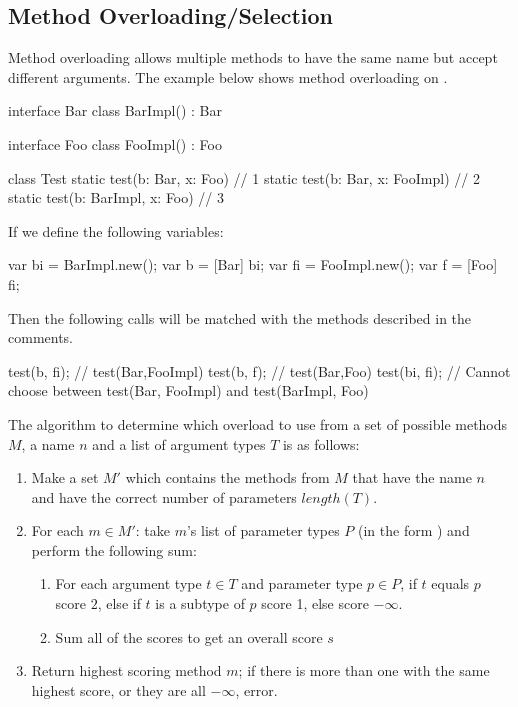 \documentclass{article}
\newcommand{\bt}{\ensuremath{^{\backprime}}}
\newcommand{\code}[1]{\texttt{\StrSubstitute{#1}{`}{\bt}}}
\newcommand{\bcode}[1]{\code{#1}}
\begin{document}
\subsection{Method Overloading/Selection}
\label{sec:methodOverloadSelection}
Method overloading allows multiple methods to have the same name but accept different arguments. The example below shows method overloading on \bcode{test}.
\begin{sooplisting}
interface Bar {}
class BarImpl() : Bar {}

interface Foo {}
class FooImpl() : Foo {}

class Test {
	static test(b: Bar, x: Foo) {} // 1
	static test(b: Bar, x: FooImpl) {} // 2
	static test(b: BarImpl, x: Foo) {} // 3		
}
\end{sooplisting}
If we define the following variables:
\begin{sooplisting}
var bi = BarImpl.new();
var b  = [Bar] bi;
var fi = FooImpl.new();
var f  = [Foo] fi;
\end{sooplisting}
Then the following calls will be matched with the methods described in the comments.
\begin{sooplisting}
test(b, fi);  // test(Bar,FooImpl)
test(b, f);   // test(Bar,Foo)
test(bi, fi); // Cannot choose between test(Bar, FooImpl) and test(BarImpl, Foo)
\end{sooplisting}
The algorithm to determine which overload to use from a set of possible methods $M$, a name $n$ and a list of argument types $T$ is as follows:
\begin{enumerate}
	\item{Make a set $M'$ which contains the methods from $M$ that have the name $n$ and have the correct number of parameters $length(T)$.}
	\item{For each $m \in M'$: take $m$'s list of parameter types $P$ (in the form \bcode{n($p_1,p_2,\dots,p_{|P|}$)}) and perform the following sum:
		\begin{enumerate}
			\item{For each argument type $t \in T$ and parameter type $p \in P$, if $t$ equals $p$ score $2$, else if $t$ is a subtype of $p$ score 1, else score $-\infty$.}
			\item{Sum all of the scores to get an overall score $s$}
		\end{enumerate}
	}
	\item{Return highest scoring method $m$; if there is more than one with the same highest score, or they are all $-\infty$, error.}
\end{enumerate}
\end{document}
